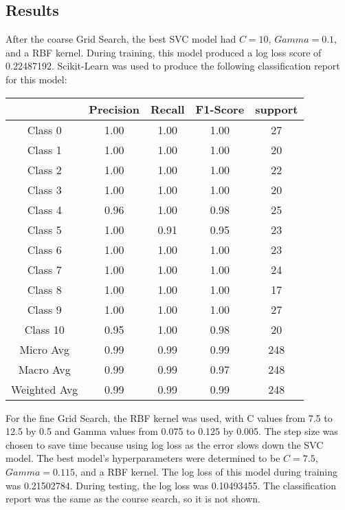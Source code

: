 \documentclass[12pt]{article}
\begin{document}
    \subsection{Results}
    After the coarse Grid Search, the best SVC model had $C = 10$, $Gamma = 0.1$, and a RBF kernel. During training, this model produced a log loss score of 0.22487192. Scikit-Learn was used to produce the following classification report for this model:
    \begin{center}
    	\begin{tabular}{| c | c | c | c | c |}
    		\hline
    		& Precision & Recall & F1-Score & support \\ \hline
    		Class 0 & 1.00 & 1.00 & 1.00 & 27 \\ \hline
    		Class 1 & 1.00 & 1.00 & 1.00 & 20 \\ \hline
    		Class 2 & 1.00 & 1.00 & 1.00 & 22 \\ \hline
    		Class 3 & 1.00 & 1.00 & 1.00 & 20 \\ \hline
    		Class 4 & 0.96 & 1.00 & 0.98 & 25 \\ \hline
    		Class 5 & 1.00 & 0.91 & 0.95 & 23 \\ \hline
    		Class 6 & 1.00 & 1.00 & 1.00 & 23 \\ \hline
    		Class 7 & 1.00 & 1.00 & 1.00 & 24 \\ \hline
    		Class 8 & 1.00 & 1.00 & 1.00 & 17 \\ \hline
    		Class 9 & 1.00 & 1.00 & 1.00 & 27 \\ \hline
    		Class 10 & 0.95 & 1.00 & 0.98 & 20 \\ \hline
    		Micro Avg & 0.99 & 0.99 & 0.99 & 248 \\ \hline
    		Macro Avg & 0.99 & 0.99 & 0.97 & 248 \\ \hline
    		Weighted Avg & 0.99 & 0.99 & 0.99 & 248 \\ \hline
    	\end{tabular}
    \end{center}
    For the fine Grid Search, the RBF kernel was used, with C values from 7.5 to 12.5 by 0.5 and Gamma values from 0.075 to 0.125 by 0.005. The step size was chosen to save time because using log loss as the error slows down the SVC model. The best model's hyperparameters were determined to be $C = 7.5$, $Gamma = 0.115$, and a RBF kernel. The log loss of this model during training was 0.21502784. During testing, the log loss was 0.10493455. The classification report was the same as the course search, so it is not shown.
    
\end{document}
